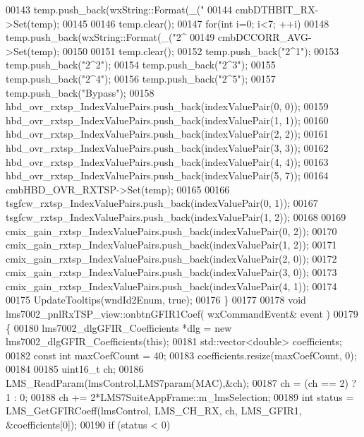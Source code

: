 \begin{DoxyCode}
{00143         temp.push\_back(wxString::Format(\_(\textcolor{stringliteral}{"%
00144     cmbDTHBIT_RX->Set(temp);
00145 
00146     temp.clear();
00147     \textcolor{keywordflow}{for}(\textcolor{keywordtype}{int} i=0; i<7; ++i)
00148         temp.push\_back(wxString::Format(\_(\textcolor{stringliteral}{"2^%
00149     cmbDCCORR_AVG->Set(temp);
00150 
00151     temp.clear();
00152     temp.push\_back(\textcolor{stringliteral}{"2^1"});
00153     temp.push\_back(\textcolor{stringliteral}{"2^2"});
00154     temp.push\_back(\textcolor{stringliteral}{"2^3"});
00155     temp.push\_back(\textcolor{stringliteral}{"2^4"});
00156     temp.push\_back(\textcolor{stringliteral}{"2^5"});
00157     temp.push\_back(\textcolor{stringliteral}{"Bypass"});
00158     hbd_ovr_rxtsp_IndexValuePairs.push\_back(indexValuePair(0, 0));
00159     hbd_ovr_rxtsp_IndexValuePairs.push\_back(indexValuePair(1, 1));
00160     hbd_ovr_rxtsp_IndexValuePairs.push\_back(indexValuePair(2, 2));
00161     hbd_ovr_rxtsp_IndexValuePairs.push\_back(indexValuePair(3, 3));
00162     hbd_ovr_rxtsp_IndexValuePairs.push\_back(indexValuePair(4, 4));
00163     hbd_ovr_rxtsp_IndexValuePairs.push\_back(indexValuePair(5, 7));
00164     cmbHBD_OVR_RXTSP->Set(temp);
00165 
00166     tsgfcw_rxtsp_IndexValuePairs.push\_back(indexValuePair(0, 1));
00167     tsgfcw_rxtsp_IndexValuePairs.push\_back(indexValuePair(1, 2));
00168 
00169     cmix_gain_rxtsp_IndexValuePairs.push\_back(indexValuePair(0, 2));
00170     cmix_gain_rxtsp_IndexValuePairs.push\_back(indexValuePair(1, 2));
00171     cmix_gain_rxtsp_IndexValuePairs.push\_back(indexValuePair(2, 0));
00172     cmix_gain_rxtsp_IndexValuePairs.push\_back(indexValuePair(3, 0));
00173     cmix_gain_rxtsp_IndexValuePairs.push\_back(indexValuePair(4, 1));
00174 
00175     UpdateTooltips(wndId2Enum, \textcolor{keyword}{true});
00176 \}
00177 
00178 \textcolor{keywordtype}{void} lms7002_pnlRxTSP_view::onbtnGFIR1Coef( wxCommandEvent& event )
00179 \{
00180     lms7002_dlgGFIR_Coefficients *dlg = \textcolor{keyword}{new} lms7002_dlgGFIR_Coefficients(\textcolor{keyword}{this});
00181     std::vector<double> coefficients;
00182     \textcolor{keyword}{const} \textcolor{keywordtype}{int} maxCoefCount = 40;
00183     coefficients.resize(maxCoefCount, 0);
00184 
00185     uint16\_t ch;
00186     LMS_ReadParam(lmsControl,LMS7param(MAC),&ch);
00187     ch = (ch == 2) ? 1 : 0;
00188     ch += 2*LMS7SuiteAppFrame::m_lmsSelection;
00189     \textcolor{keywordtype}{int} status =  LMS_GetGFIRCoeff(lmsControl, LMS_CH_RX, ch, LMS_GFIR1, &coefficients[0]);
00190     \textcolor{keywordflow}{if} (status < 0)
}}}
\end{DoxyCode}
